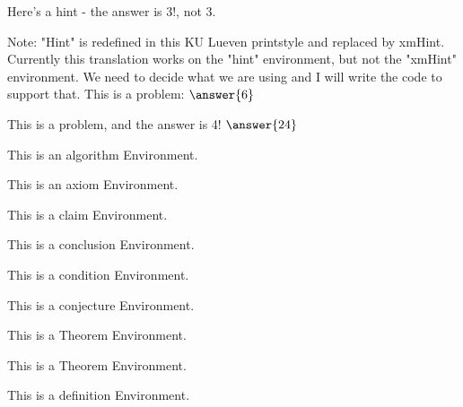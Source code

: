 \documentclass{ximera}
\begin{document}
        \begin{exercise}
            \begin{hint}
                Here's a hint - the answer is 3!, not 3.
            \end{hint}
            Note: "Hint" is redefined in this KU Lueven printstyle and replaced by xmHint. Currently this translation works on the "hint" environment, but not the "xmHint" environment. We need to decide what we are using and I will write the code to support that.
            This is a problem: $\answer{6}$
        \end{exercise}
            
        \begin{exploration}
            This is a problem, and the answer is 4! $\answer{24}$
        \end{exploration}
        \begin{algorithm}
            This is an algorithm Environment.
        \end{algorithm}%
        \begin{axiom}
            This is an axiom Environment.
        \end{axiom}%
        \begin{claim}
            This is a claim Environment.
        \end{claim}%
        \begin{conclusion}
            This is a conclusion Environment.
        \end{conclusion}%
        \begin{condition}
            This is a condition Environment.
        \end{condition}%
        \begin{conjecture}
            This is a conjecture Environment.
        \end{conjecture}%
        \begin{corollary}
            This is a Theorem Environment.
        \end{corollary}%
        \begin{criterion}
            This is a Theorem Environment.
        \end{criterion}%
        \begin{definition}
            This is a definition Environment.
        \end{definition}%
\end{document}
